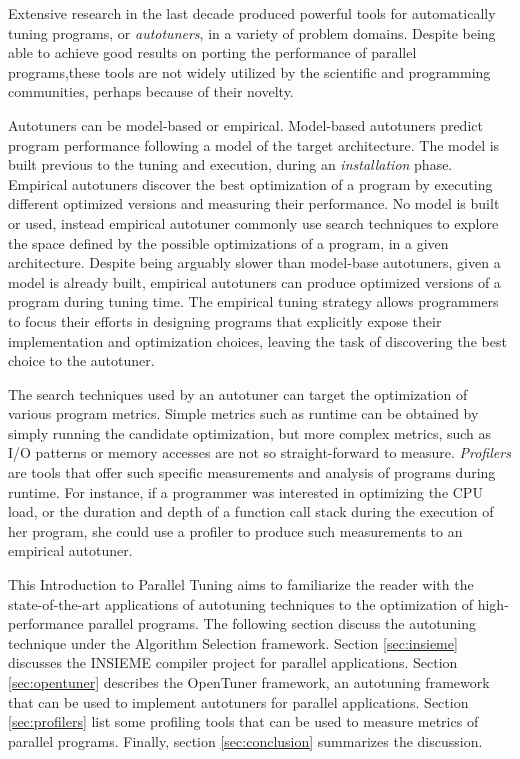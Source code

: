 \documentclass[a4paper, 12pt]{article}
\begin{document}
Extensive research in the last decade produced powerful tools for
automatically tuning programs, or \emph{autotuners}, in a variety of problem
domains. Despite being able to achieve good results on porting the performance
of parallel programs,these tools are not widely utilized by the scientific
and programming communities, perhaps because of their novelty.

Autotuners can be model-based or empirical. Model-based autotuners predict
program performance following a model of the target architecture. The model
is built previous to the tuning and execution, during an \emph{installation}
phase. Empirical autotuners discover the best optimization of a program by
executing different optimized versions and measuring their performance. No
model is built or used, instead empirical autotuner commonly use search
techniques to explore the space defined by the possible optimizations
of a program, in a given architecture. Despite being arguably slower than
model-base autotuners, given a model is already built, empirical autotuners
can produce optimized versions of a program during tuning time. The empirical
tuning strategy allows programmers to focus their efforts in designing
programs that explicitly expose their implementation and optimization choices,
leaving the task of discovering the best choice to the autotuner.

The search techniques used by an autotuner can target the optimization of
various program metrics. Simple metrics such as runtime can be obtained by
simply running the candidate optimization, but more complex metrics, such
as I/O patterns or memory accesses are not so straight-forward to measure.
\emph{Profilers} are tools that offer such specific measurements and analysis
of programs during runtime. For instance, if a programmer was interested in
optimizing the CPU load, or the duration and depth of a function call stack
during the execution of her program, she could use a profiler to produce such
measurements to an empirical autotuner.

This Introduction to Parallel Tuning aims to familiarize the reader with the
state-of-the-art applications of autotuning techniques to the optimization
of high-performance parallel programs. The following section discuss the
autotuning technique under the Algorithm Selection framework. Section
\ref{sec:insieme} discusses the INSIEME compiler project for parallel
applications. Section \ref{sec:opentuner} describes the OpenTuner framework,
an autotuning framework that can be used to implement autotuners for parallel
applications. Section \ref{sec:profilers} list some profiling tools that can
be used to measure metrics of parallel programs. 
Finally, section \ref{sec:conclusion} summarizes the discussion.
\end{document}
